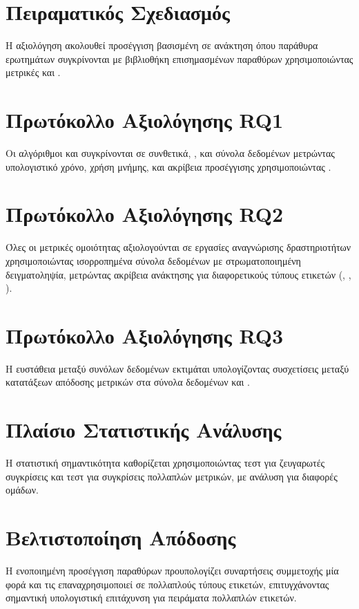 \section{Πειραματικός Σχεδιασμός}
Η αξιολόγηση ακολουθεί προσέγγιση βασισμένη σε ανάκτηση όπου παράθυρα ερωτημάτων συγκρίνονται με βιβλιοθήκη επισημασμένων παραθύρων χρησιμοποιώντας μετρικές  και .

\section{Πρωτόκολλο Αξιολόγησης RQ1}
Οι αλγόριθμοι  και  συγκρίνονται σε συνθετικά, , και  σύνολα δεδομένων μετρώντας υπολογιστικό χρόνο, χρήση μνήμης, και ακρίβεια προσέγγισης χρησιμοποιώντας .

\section{Πρωτόκολλο Αξιολόγησης RQ2}
Όλες οι μετρικές ομοιότητας αξιολογούνται σε εργασίες αναγνώρισης δραστηριοτήτων χρησιμοποιώντας ισορροπημένα σύνολα δεδομένων με στρωματοποιημένη δειγματοληψία, μετρώντας ακρίβεια ανάκτησης για διαφορετικούς τύπους ετικετών (, , ).

\section{Πρωτόκολλο Αξιολόγησης RQ3}
Η ευστάθεια μεταξύ συνόλων δεδομένων εκτιμάται υπολογίζοντας συσχετίσεις  μεταξύ κατατάξεων απόδοσης μετρικών στα σύνολα δεδομένων  και .

\section{Πλαίσιο Στατιστικής Ανάλυσης}
Η στατιστική σημαντικότητα καθορίζεται χρησιμοποιώντας τεστ  για ζευγαρωτές συγκρίσεις και τεστ  για συγκρίσεις πολλαπλών μετρικών, με ανάλυση  για διαφορές ομάδων.

\section{Βελτιστοποίηση Απόδοσης}
Η ενοποιημένη προσέγγιση παραθύρων προυπολογίζει συναρτήσεις συμμετοχής μία φορά και τις επαναχρησιμοποιεί σε πολλαπλούς τύπους ετικετών, επιτυγχάνοντας σημαντική υπολογιστική επιτάχυνση για πειράματα πολλαπλών ετικετών.

